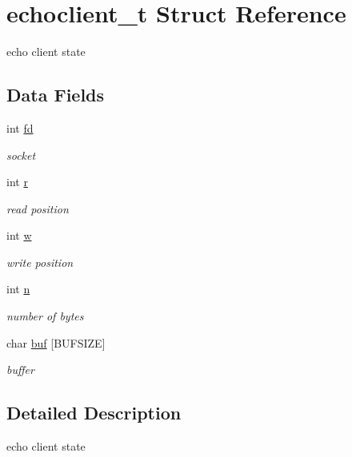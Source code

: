 \hypertarget{structechoclient__t}{
\section{echoclient\_\-t Struct Reference}
\label{structechoclient__t}
}
echo client state  


\subsection*{Data Fields}
\begin{CompactItemize}
\item 
int \hyperlink{structechoclient__t_o0}{fd}
\begin{CompactList}\small\item\em socket \item\end{CompactList}\item 
int \hyperlink{structechoclient__t_o1}{r}
\begin{CompactList}\small\item\em read position \item\end{CompactList}\item 
int \hyperlink{structechoclient__t_o2}{w}
\begin{CompactList}\small\item\em write position \item\end{CompactList}\item 
int \hyperlink{structechoclient__t_o3}{n}
\begin{CompactList}\small\item\em number of bytes \item\end{CompactList}\item 
char \hyperlink{structechoclient__t_o4}{buf} \mbox{[}BUFSIZE\mbox{]}
\begin{CompactList}\small\item\em buffer \item\end{CompactList}\end{CompactItemize}


\subsection{Detailed Description}
echo client state 



